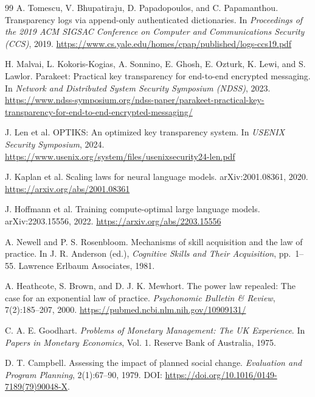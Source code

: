 \documentclass[11pt]{article}
\newcommand{\1}{\mathbf{1}}
\theoremstyle{definition}
\theoremstyle{plain}
\begin{document}
\begin{thebibliography}{99}
A. Tomescu, V. Bhupatiraju, D. Papadopoulos, and C. Papamanthou.
Transparency logs via append-only authenticated dictionaries.
In \emph{Proceedings of the 2019 ACM SIGSAC Conference on Computer and Communications Security (CCS)}, 2019.
\href{https://www.cs.yale.edu/homes/cpap/published/logs-ccs19.pdf}{https://www.cs.yale.edu/homes/cpap/published/logs-ccs19.pdf}

H. Malvai, L. Kokoris-Kogias, A. Sonnino, E. Ghosh, E. Ozturk, K. Lewi, and S. Lawlor.
Parakeet: Practical key transparency for end-to-end encrypted messaging.
In \emph{Network and Distributed System Security Symposium (NDSS)}, 2023.
\href{https://www.ndss-symposium.org/ndss-paper/parakeet-practical-key-transparency-for-end-to-end-encrypted-messaging/}{https://www.ndss-symposium.org/ndss-paper/parakeet-practical-key-transparency-for-end-to-end-encrypted-messaging/}

J. Len et al.
OPTIKS: An optimized key transparency system.
In \emph{USENIX Security Symposium}, 2024.
\href{https://www.usenix.org/system/files/usenixsecurity24-len.pdf}{https://www.usenix.org/system/files/usenixsecurity24-len.pdf}

J. Kaplan et al.
Scaling laws for neural language models.
arXiv:2001.08361, 2020.
\href{https://arxiv.org/abs/2001.08361}{https://arxiv.org/abs/2001.08361}

J. Hoffmann et al.
Training compute-optimal large language models.
arXiv:2203.15556, 2022.
\href{https://arxiv.org/abs/2203.15556}{https://arxiv.org/abs/2203.15556}

A. Newell and P. S. Rosenbloom.
Mechanisms of skill acquisition and the law of practice.
In J. R. Anderson (ed.), \emph{Cognitive Skills and Their Acquisition}, pp.\ 1--55.
Lawrence Erlbaum Associates, 1981.

A. Heathcote, S. Brown, and D. J. K. Mewhort.
The power law repealed: The case for an exponential law of practice.
\emph{Psychonomic Bulletin \& Review}, 7(2):185--207, 2000.
\href{https://pubmed.ncbi.nlm.nih.gov/10909131/}{https://pubmed.ncbi.nlm.nih.gov/10909131/}

C. A. E. Goodhart.
\emph{Problems of Monetary Management: The UK Experience}.
In \emph{Papers in Monetary Economics}, Vol. 1. Reserve Bank of Australia, 1975.

D. T. Campbell.
Assessing the impact of planned social change.
\emph{Evaluation and Program Planning}, 2(1):67--90, 1979. DOI: \url{https://doi.org/10.1016/0149-7189(79)90048-X}.


\end{thebibliography}
\end{document}
